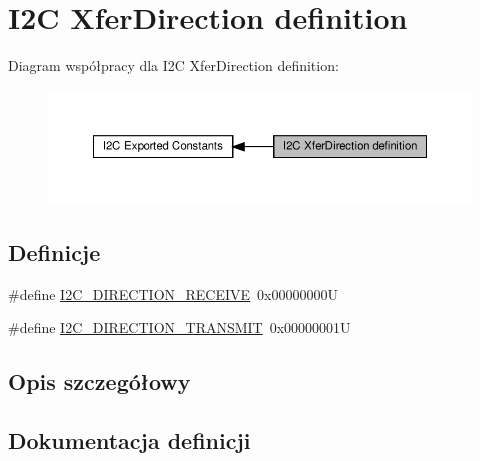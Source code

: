 \hypertarget{group___i2_c___xfer_direction__definition}{}\section{I2C Xfer\+Direction definition}
\label{group___i2_c___xfer_direction__definition}
Diagram współpracy dla I2C Xfer\+Direction definition\+:\nopagebreak
\begin{figure}[H]
\begin{center}
\leavevmode
\includegraphics[width=350pt]{group___i2_c___xfer_direction__definition}
\end{center}
\end{figure}
\subsection*{Definicje}
\begin{DoxyCompactItemize}
\item 
\#define \hyperlink{group___i2_c___xfer_direction__definition_gacfbbd511a4f68bbd9965d0e5a192e261}{I2\+C\+\_\+\+D\+I\+R\+E\+C\+T\+I\+O\+N\+\_\+\+R\+E\+C\+E\+I\+VE}~0x00000000U
\item 
\#define \hyperlink{group___i2_c___xfer_direction__definition_ga4995d0291421b538d7859e998803c567}{I2\+C\+\_\+\+D\+I\+R\+E\+C\+T\+I\+O\+N\+\_\+\+T\+R\+A\+N\+S\+M\+IT}~0x00000001U
\end{DoxyCompactItemize}


\subsection{Opis szczegółowy}


\subsection{Dokumentacja definicji}
\mbox{\label{group___i2_c___xfer_direction__definition_gacfbbd511a4f68bbd9965d0e5a192e261}} 
